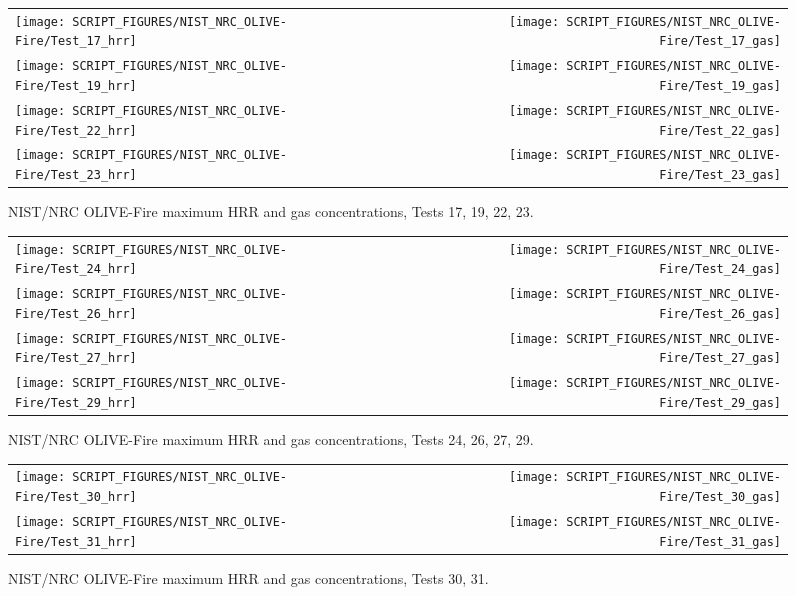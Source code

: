 \begin{figure}[p]
\begin{tabular*}{\textwidth}{l@{\extracolsep{\fill}}r}
\texttt{[image: SCRIPT\_FIGURES/NIST\_NRC\_OLIVE-Fire/Test\_17\_hrr]} &
\texttt{[image: SCRIPT\_FIGURES/NIST\_NRC\_OLIVE-Fire/Test\_17\_gas]} \\
\texttt{[image: SCRIPT\_FIGURES/NIST\_NRC\_OLIVE-Fire/Test\_19\_hrr]} &
\texttt{[image: SCRIPT\_FIGURES/NIST\_NRC\_OLIVE-Fire/Test\_19\_gas]} \\
\texttt{[image: SCRIPT\_FIGURES/NIST\_NRC\_OLIVE-Fire/Test\_22\_hrr]} &
\texttt{[image: SCRIPT\_FIGURES/NIST\_NRC\_OLIVE-Fire/Test\_22\_gas]} \\
\texttt{[image: SCRIPT\_FIGURES/NIST\_NRC\_OLIVE-Fire/Test\_23\_hrr]} &
\texttt{[image: SCRIPT\_FIGURES/NIST\_NRC\_OLIVE-Fire/Test\_23\_gas]}
\end{tabular*}
\caption[NIST/NRC OLIVE-Fire maximum HRR and gas concentrations, Tests 17, 19, 22, 23]
{NIST/NRC OLIVE-Fire maximum HRR and gas concentrations, Tests 17, 19, 22, 23.}
\label{NIST_NRC_HRR_3}
\end{figure}

\begin{figure}[p]
\begin{tabular*}{\textwidth}{l@{\extracolsep{\fill}}r}
\texttt{[image: SCRIPT\_FIGURES/NIST\_NRC\_OLIVE-Fire/Test\_24\_hrr]} &
\texttt{[image: SCRIPT\_FIGURES/NIST\_NRC\_OLIVE-Fire/Test\_24\_gas]} \\
\texttt{[image: SCRIPT\_FIGURES/NIST\_NRC\_OLIVE-Fire/Test\_26\_hrr]} &
\texttt{[image: SCRIPT\_FIGURES/NIST\_NRC\_OLIVE-Fire/Test\_26\_gas]} \\
\texttt{[image: SCRIPT\_FIGURES/NIST\_NRC\_OLIVE-Fire/Test\_27\_hrr]} &
\texttt{[image: SCRIPT\_FIGURES/NIST\_NRC\_OLIVE-Fire/Test\_27\_gas]} \\
\texttt{[image: SCRIPT\_FIGURES/NIST\_NRC\_OLIVE-Fire/Test\_29\_hrr]} &
\texttt{[image: SCRIPT\_FIGURES/NIST\_NRC\_OLIVE-Fire/Test\_29\_gas]}
\end{tabular*}
\caption[NIST/NRC OLIVE-Fire maximum HRR and gas concentrations, Tests 24, 26, 27, 29]
{NIST/NRC OLIVE-Fire maximum HRR and gas concentrations, Tests 24, 26, 27, 29.}
\label{NIST_NRC_HRR_4}
\end{figure}

\begin{figure}[p]
\begin{tabular*}{\textwidth}{l@{\extracolsep{\fill}}r}
\texttt{[image: SCRIPT\_FIGURES/NIST\_NRC\_OLIVE-Fire/Test\_30\_hrr]} &
\texttt{[image: SCRIPT\_FIGURES/NIST\_NRC\_OLIVE-Fire/Test\_30\_gas]} \\
\texttt{[image: SCRIPT\_FIGURES/NIST\_NRC\_OLIVE-Fire/Test\_31\_hrr]} &
\texttt{[image: SCRIPT\_FIGURES/NIST\_NRC\_OLIVE-Fire/Test\_31\_gas]}
\end{tabular*}
\caption[NIST/NRC OLIVE-Fire maximum HRR and gas concentrations, Tests 30, 31]
{NIST/NRC OLIVE-Fire maximum HRR and gas concentrations, Tests 30, 31.}
\label{NIST_NRC_HRR_5}
\end{figure}

